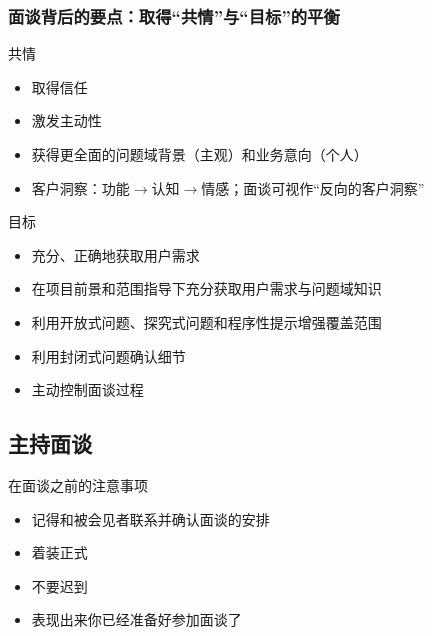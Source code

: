 \subsubsection{面谈背后的要点：取得“共情”与“目标”的平衡}
共情
\vspace{-0.8em}
\begin{multicols}{2}
    \begin{itemize}
        \item 取得信任
        \item 激发主动性
        \item 获得更全面的问题域背景（主观）和业务意向（个人）
        \item 客户洞察：功能$\rightarrow$认知$\rightarrow$情感；面谈可视作“反向的客户洞察”
    \end{itemize}
\end{multicols}
\vspace{-1em}

目标
\vspace{-0.8em}
\begin{multicols}{2}
    \begin{itemize}
        \item 充分、正确地获取用户需求
        \item 在项目前景和范围指导下充分获取用户需求与问题域知识
        \item 利用开放式问题、探究式问题和程序性提示增强覆盖范围
        \item 利用封闭式问题确认细节
        \item 主动控制面谈过程
    \end{itemize}
\end{multicols}
\vspace{-1em}


\subsection{主持面谈}
在面谈之前的注意事项
\vspace{-0.8em}
\begin{multicols}{2}
    \begin{itemize}
        \item 记得和被会见者联系并确认面谈的安排
        \item 着装正式
        \item 不要迟到
        \item 表现出来你已经准备好参加面谈了
    \end{itemize}
\end{multicols}
\vspace{-1em}

